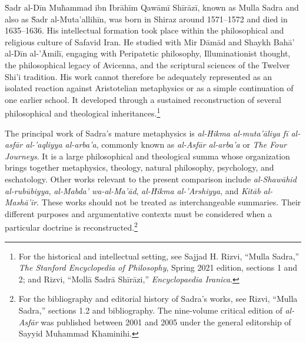 \label{para:VS.B01.P01.C08.S17.SS02.P001}

\.{S}adr al-D\={i}n Mu\.{h}ammad ibn Ibr\={a}h\={i}m Qaw\={a}m\={i} Sh\={i}r\={a}z\={i},
known as Mulla Sadra and also as \.{S}adr al-Muta'allih\={i}n,
was born in Shiraz around 1571--1572 and died in
1635--1636. His intellectual formation took place
within the philosophical and religious culture of
Safavid Iran. He studied with Mir D\={a}m\={a}d and
Shaykh Bah\={a}' al-D\={i}n al-'\={A}mil\={i}, engaging with
Peripatetic philosophy, Illuminationist thought,
the philosophical legacy of Avicenna, and the
scriptural sciences of the Twelver Shi'i tradition.
His work cannot therefore be adequately represented
as an isolated reaction against Aristotelian
metaphysics or as a simple continuation of one
earlier school. It developed through a sustained
reconstruction of several philosophical and
theological inheritances.\footnote{For the historical
and intellectual setting, see Sajjad H. Rizvi,
``Mulla Sadra,'' \textit{The Stanford Encyclopedia
of Philosophy}, Spring 2021 edition, sections 1
and 2; and Rizvi, ``Moll\={a} \.{S}adr\={a} Sh\={i}r\={a}zi,''
\textit{Encyclopaedia Iranica}.}

\label{para:VS.B01.P01.C08.S17.SS02.P002}

The principal work of Sadra's mature metaphysics
is \textit{al-\.{H}ikma al-muta'\={a}liya f\={i} al-asf\={a}r
al-'aqliyya al-arba'a}, commonly known as
\textit{al-Asf\={a}r al-arba'a} or \textit{The Four
Journeys}. It is a large philosophical and
theological summa whose organization brings
together metaphysics, theology, natural philosophy,
psychology, and eschatology. Other works relevant
to the present comparison include
\textit{al-Shaw\={a}hid al-rub\={u}biyya},
\textit{al-Mabda' wa-al-Ma'\={a}d},
\textit{al-\.{H}ikma al-'Arshiyya}, and
\textit{Kit\={a}b al-Mash\={a}'ir}. These works should
not be treated as interchangeable summaries.
Their different purposes and argumentative
contexts must be considered when a particular
doctrine is reconstructed.\footnote{For the
bibliography and editorial history of Sadra's
works, see Rizvi, ``Mulla Sadra,'' sections
1.2 and bibliography. The nine-volume critical
edition of \textit{al-Asf\={a}r} was published
between 2001 and 2005 under the general
editorship of Sayyid Muhammad Khaminihi.}

\label{para:VS.B01.P01.C08.S17.SS02.P003}

